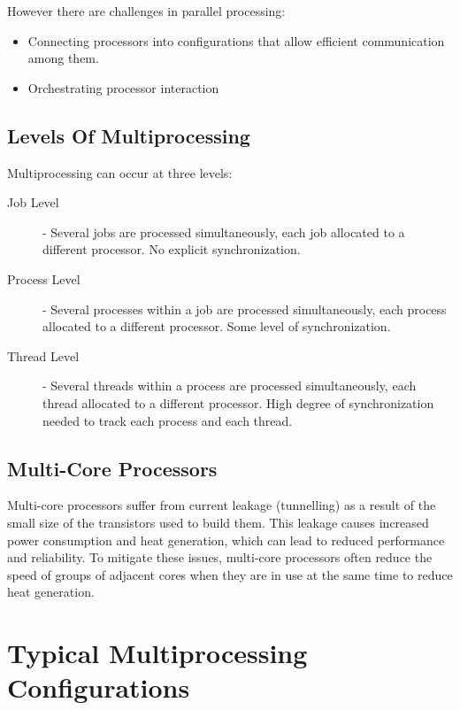 \documentclass[12pt letter]{report}
\begin{document}
However there are challenges in parallel processing:
\begin{itemize}
  \item Connecting processors into configurations that allow efficient
    communication among them.
  \item Orchestrating processor interaction
\end{itemize}

\subsection{Levels Of Multiprocessing}

Multiprocessing can occur at three levels:
\begin{description}
  \item[Job Level]  - Several jobs are processed simultaneously,
    each job allocated to a different processor. No explicit synchronization.
  \item[Process Level]  - Several processes within a job are
    processed simultaneously, each process allocated to a different
    processor. Some level of synchronization.
  \item[Thread Level] - Several threads within a process are processed
    simultaneously, each thread allocated to a different processor.
    High degree of synchronization needed to track each process and each thread.
\end{description}

\subsection{Multi-Core Processors}


Multi-core processors suffer from current leakage (tunnelling) as a
result of the
small size of the transistors used to build them. This leakage causes
increased power consumption and heat generation, which can lead to
reduced performance and reliability. To mitigate these issues,
multi-core processors often
reduce the speed of groups of adjacent cores when they are in use at
the same time to reduce heat generation.

\section{Typical Multiprocessing Configurations}
\end{document}
